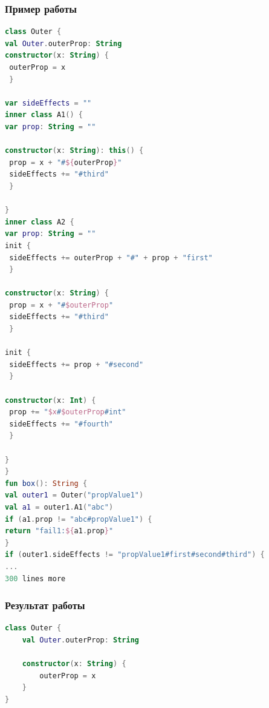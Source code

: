 
\begin{frame}[fragile]
	\frametitle{Пример работы}
	\begin{lstlisting}[basicstyle=\fontsize{4}{1}\selectfont \ttfamily, language = Kotlin]
class Outer {
val Outer.outerProp: String
constructor(x: String) {
 outerProp = x
 }

var sideEffects = ""
inner class A1() {
var prop: String = ""

constructor(x: String): this() {
 prop = x + "#${outerProp}"
 sideEffects += "#third"
 }

}
inner class A2 {
var prop: String = ""
init {
 sideEffects += outerProp + "#" + prop + "first"
 }

constructor(x: String) {
 prop = x + "#$outerProp"
 sideEffects += "#third"
 }

init {
 sideEffects += prop + "#second"
 }

constructor(x: Int) {
 prop += "$x#$outerProp#int"
 sideEffects += "#fourth"
 }

}
}
fun box(): String {
val outer1 = Outer("propValue1")
val a1 = outer1.A1("abc")
if (a1.prop != "abc#propValue1") {
return "fail1:${a1.prop}"
}
if (outer1.sideEffects != "propValue1#first#second#third") {
...
300 lines more
\end{lstlisting}
	
\end{frame}


\begin{frame}[fragile]
	\frametitle{Результат работы}
	\begin{lstlisting}[basicstyle=\footnotesize, language = Kotlin]
class Outer {
    val Outer.outerProp: String

    constructor(x: String) {
        outerProp = x
    }
}
\end{lstlisting}
	
\end{frame}



